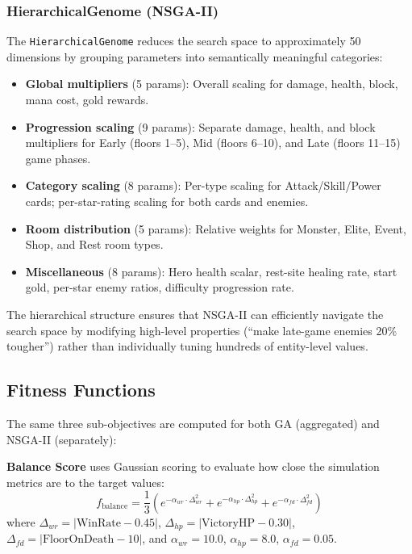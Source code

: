 \subsubsection{HierarchicalGenome (NSGA-II)}

The \texttt{HierarchicalGenome} reduces the search space to approximately 50 dimensions by grouping parameters into semantically meaningful categories:
\begin{itemize}
    \item \textbf{Global multipliers} (5 params): Overall scaling for damage, health, block, mana cost, gold rewards.
    \item \textbf{Progression scaling} (9 params): Separate damage, health, and block multipliers for Early (floors 1--5), Mid (floors 6--10), and Late (floors 11--15) game phases.
    \item \textbf{Category scaling} (8 params): Per-type scaling for Attack/Skill/Power cards; per-star-rating scaling for both cards and enemies.
    \item \textbf{Room distribution} (5 params): Relative weights for Monster, Elite, Event, Shop, and Rest room types.
    \item \textbf{Miscellaneous} (8 params): Hero health scalar, rest-site healing rate, start gold, per-star enemy ratios, difficulty progression rate.
\end{itemize}
The hierarchical structure ensures that NSGA-II can efficiently navigate the search space by modifying high-level properties (``make late-game enemies 20\% tougher'') rather than individually tuning hundreds of entity-level values.

\subsection{Fitness Functions}

The same three sub-objectives are computed for both GA (aggregated) and NSGA-II (separately):

\textbf{Balance Score} uses Gaussian scoring to evaluate how close the simulation metrics are to the target values:
\begin{equation}
f_{\text{balance}} = \frac{1}{3}\left(e^{-\alpha_{wr} \cdot \Delta_{wr}^2} + e^{-\alpha_{hp} \cdot \Delta_{hp}^2} + e^{-\alpha_{fd} \cdot \Delta_{fd}^2}\right)
\label{eq:balance_score}
\end{equation}
where $\Delta_{wr} = |\text{WinRate} - 0.45|$, $\Delta_{hp} = |\text{VictoryHP} - 0.30|$, $\Delta_{fd} = |\text{FloorOnDeath} - 10|$, and $\alpha_{wr}=10.0$, $\alpha_{hp}=8.0$, $\alpha_{fd}=0.05$.

